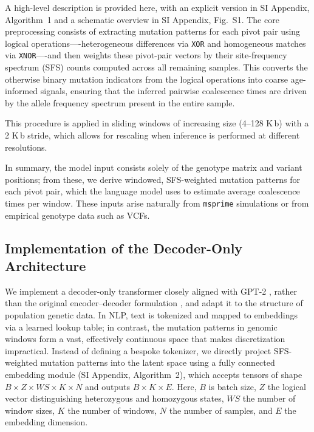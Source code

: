 \documentclass[9pt,twocolumn,twoside]{pnas-new} %
\begin{document}
{A high-level description is provided here, 
with an explicit version in SI Appendix, Algorithm~1 
and a schematic overview in SI Appendix, Fig.~S1. 
The core preprocessing consists of extracting mutation patterns for each pivot pair
using logical operations—-heterogeneous differences via \texttt{XOR} 
and homogeneous matches via \texttt{XNOR}—-and then weights these pivot-pair vectors
by their site-frequency spectrum (SFS) counts computed across all remaining samples. 
This converts the otherwise binary mutation indicators from the logical operations
into coarse age-informed signals, 
ensuring that the inferred pairwise coalescence times are driven 
by the allele frequency spectrum present in the entire sample.

This procedure is applied in sliding windows of increasing size (4–128 K\,b)
with a 2 K\,b stride, which allows for rescaling when
inference is performed at different resolutions. 

In summary, the model input consists solely of the genotype matrix and variant positions; 
from these, we derive windowed, SFS-weighted mutation patterns for each pivot pair, 
which the language model uses to estimate average coalescence times per window. 
These inputs arise naturally from \texttt{msprime} simulations or from empirical genotype data such as VCFs.


\subsection*{Implementation of the Decoder-Only Architecture}

We implement a decoder-only transformer closely aligned with GPT-2 \cite{radford_language_2019}, 
rather than the original encoder–decoder formulation \cite{vaswani_attention_2017}, 
and adapt it to the structure of population genetic data. 
In NLP, text is tokenized and mapped to embeddings via a learned lookup table; 
in contrast, the mutation patterns in genomic windows form a vast,
effectively continuous space that makes discretization impractical. 
Instead of defining a bespoke tokenizer,
we directly project SFS-weighted mutation patterns into the latent space using a fully connected embedding module (SI Appendix, Algorithm~2),
which accepts tensors of shape $B \times Z \times WS \times K \times N$ and outputs $B \times K \times E$. 
Here, $B$ is batch size, $Z$ the logical vector distinguishing heterozygous and homozygous states, $WS$ the number of window sizes, $K$ the number of windows, $N$ the number of samples, and $E$ the embedding dimension.

}
\end{document}
